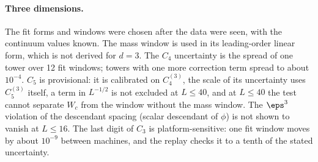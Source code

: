 \paragraph{Three dimensions.}\label{d3:caveats}
The fit forms and windows were chosen after the data were seen, with the continuum values known. The mass window is used
in its leading-order linear form, which is not derived for $d=3$. The $C_4$ uncertainty is the spread of one tower over
12 fit windows; towers with one more correction term spread to about $10^{-4}$. $C_5$ is provisional: it is calibrated on
$C_4^{(3)}$, the scale of its uncertainty uses $C_5^{(3)}$ itself, a term in $L^{-1/2}$ is not excluded at $L\le40$, and
at $L\le40$ the test cannot separate $W_c$ from the window without the mass window. The $\eps^3$ violation of the descendant
spacing (scalar descendant of $\phi$) is not shown to vanish at $L\le16$. The last digit of $C_3$ is platform-sensitive: one fit window moves by about
$10^{-9}$ between machines, and the replay checks it to a tenth of the stated uncertainty.
